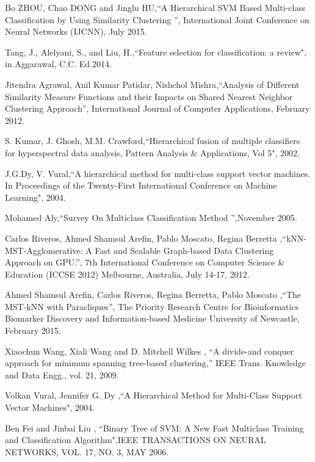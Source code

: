 \documentclass[a4paper, 10pt, conference]{ieeeconf}      %
\begin{document}
\begin{thebibliography}{99}

\bibitem{} Bo ZHOU, Chao DONG and Jinglu HU{,``A Hierarchical SVM Based Multi-class Classification by Using Similarity Clustering ”}, International Joint Conference on Neural Networks (IJCNN), July 2015. 

\bibitem{} Tang, J., Alelyani, S., and Liu, H.{,``Feature selection for classification: a review"}, in Aggarawal, C.C. Ed.2014.

\bibitem{}  Jitendra Agrawal, Anil Kumar Patidar, Nishchol Mishra{,``Analysis of Different Similarity Measure Functions and their Impacts on Shared Nearest Neighbor Clustering Approach”}, International Journal of Computer Applications, February 2012.


\bibitem{} S. Kumar, J. Ghosh, M.M. Crawford{,``Hierarchical fusion of multiple classifiers for hyperspectral data analysis, Pattern Analysis \& Applications, Vol 5"}, 2002.

\bibitem{} J.G.Dy, V. Vural{,``A hierarchical method for multi-class support vector machines. In Proceedings of the Twenty-First International Conference on Machine Learning"}, 2004.

\bibitem{} Mohamed Aly{,``Survey On Multiclass Classification Method ”},November 2005.

\bibitem{} Carlos Riveros, Ahmed Shamsul Arefin, Pablo Moscato, Regina Berretta{ ,``kNN-MST-Agglomerative: A Fast and Scalable Graph-based Data Clustering Approach on GPU.”}, 7th International Conference on Computer Science \& Education (ICCSE 2012) Melbourne, Australia, July 14-17, 2012.

\bibitem{} Ahmed Shamsul Arefin, Carlos Riveros, Regina Berretta, Pablo Moscato { ,``The MST-kNN with Paracliques”}, The Priority Research Centre for Bioinformatics Biomarker Discovery and Information-based Medicine University of Newcastle, February 2015.

\bibitem{} Xiaochun Wang, Xiali Wang and D. Mitchell Wilkes {, ``A divide-and conquer
approach for minimum spanning tree-based clustering,”} IEEE  Trans. Knowledge and Data Engg., vol. 21, 2009.

\bibitem{} Volkan Vural, Jennifer G. Dy {,``A Hierarchical Method for Multi-Class Support Vector Machines"}, 2004.

\bibitem{} Ben Fei and Jinbai Liu {, ``Binary Tree of SVM: A New Fast Multiclass
Training and Classification Algorithm"},IEEE TRANSACTIONS ON NEURAL NETWORKS, VOL. 17, NO. 3, MAY 2006.

\end{thebibliography}
\end{document}
